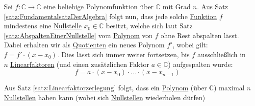 \documentclass[../../main.tex]{subfiles}
\begin{document}
		\begin{theorem}
			\label{satz:Linearfaktorzerlegung}
			Sei $f: \mathbb{C} \rightarrow \mathbb{C}$ eine beliebige \hyperref[def:Polynomfunktion]{Polynomfunktion} über $\mathbb{C}$ mit \hyperref[def:GradEinesPolynoms]{Grad} $n$. Aus Satz \ref{satz:FundamentalsatzDerAlgebra} folgt nun, dass jede solche \hyperref[def:Funktion]{Funktion} $f$ mindestens eine \hyperref[def:Nullstelle]{Nullstelle} $x_0 \in \mathbb{C}$ besitzt, welche sich laut Satz \ref{satz:AbspaltenEinerNullstelle} vom \hyperref[def:Polynom]{Polynom} von $f$ ohne Rest abspalten lässt. Dabei erhalten wir als \hyperref[def:Quotient]{Quotienten} ein neues Polynom $f'$, wobei gilt: $f=f'\cdot(x-x_0)$. Dies lässt sich immer weiter fortsetzen, bis $f$ ausschließlich in $n$ \hyperref[def:Linearfaktor]{Linearfaktoren} (und einen zusätzlichen Faktor $a \in \mathbb{C}$) aufgespalten wurde: $$f = a \cdot (x-x_0) \cdot ... \cdot (x-x_{n-1})$$
		\end{theorem}
	
		\begin{theorem}
			Aus Satz \ref{satz:Linearfaktorzerlegung} folgt, dass ein \hyperref[def:Polynom]{Polynom} (über $\mathbb{C}$) maximal $n$ \hyperref[def:Nullstelle]{Nullstellen} haben kann (wobei sich \hyperref[def:Nullstelle]{Nullstellen} wiederholen dürfen)
		\end{theorem}
	
\end{document}
